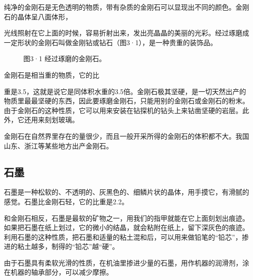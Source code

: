 纯净的金刚石是无色透明的物质，带有杂质的金刚石可以显现出不同的颜色。金刚石的晶体呈八面体形，

光线照射在它上面的时候，容易折射出来，发出亮晶晶的美丽的光彩。经过琢磨成一定形状的金刚石叫做金刚钻或钻石（图3·1），是一种贵重的装饰品。

\begin{figure}
\centering
\caption{图3·1 经过琢磨的金刚石。}
\end{figure}

金刚石是相当重的物质，它的比

重是3.5，这就是说它是同体积水重的3.5倍。金刚石极其坚硬，是一切天然出产的物质里最最坚硬的东西，因此要琢磨金刚石，只能用别的金刚石或金刚石的粉末。由于金刚石的这种性质，它可以用来安装在钻探机的钻头上来钻凿坚硬的岩层。此外，它还用来刻划玻璃。

金刚石在自然界里存在的量很少，而且一般开采所得的金刚石的体积都不大。我国山东、浙江等某些地方出产金刚石。

\subsection{石墨}

石墨是一种松软的、不透明的、灰黑色的、细鳞片状的晶体，用手摸它，有滑腻的感觉。石墨比金刚石轻，它的比重是2.2。

和金刚石相反，石墨是最软的矿物之一，用我们的指甲就能在它上面刻划出痕迹。如果把石墨在纸上划过，它的微小的结晶，就会粘附在纸上，留下深灰色的痕迹。利用石墨的这种性质，把石墨和适量的粘土混和后，可以用来做铅笔的``铅芯''，掺进的粘土越多，制得的``铅芯''越``硬''。

由于石墨具有柔软光滑的性质，在机油里掺进少量的石墨，用作机器的润滑剂，涂在机器的轴承部分，可以减少摩擦。

